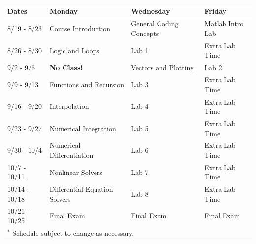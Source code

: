 \documentclass[11pt]{article}
\begin{document}
\begin{center}
	\begin{tabular}{l || l | l | l }
		\toprule
		\textbf{Dates} & \textbf{Monday} & \textbf{Wednesday} & \textbf{Friday}\\
		\midrule
		8/19  - 8/23  & Course Introduction           & General Coding Concepts & Matlab Intro Lab     \\
		8/26  - 8/30  & Logic and Loops               & Lab 1                   & Extra Lab Time       \\
		9/2   - 9/6   & \textbf{No Class!}            & Vectors and Plotting    & Lab 2                \\
		9/9  - 9/13   & Functions and Recursion       & Lab 3                   & Extra Lab Time       \\
		9/16  - 9/20  & Interpolation                 & Lab 4                   & Extra Lab Time       \\
		9/23  - 9/27  & Numerical Integration         & Lab 5                   & Extra Lab Time       \\
		9/30  - 10/4  & Numerical Differentiation     & Lab 6                   & Extra Lab Time       \\
		10/7  - 10/11 & Nonlinear Solvers             & Lab 7                   & Extra Lab Time       \\
		10/14 - 10/18 & Differential Equation Solvers & Lab 8                   & Extra Lab Time       \\
		10/21 - 10/25 & Final Exam                    & Final Exam              & Final Exam           \\
		\bottomrule
		\multicolumn{4}{l}{$^{*}$ Schedule subject to change as necessary.}\\
	\end{tabular}
\end{center}
\end{document}
